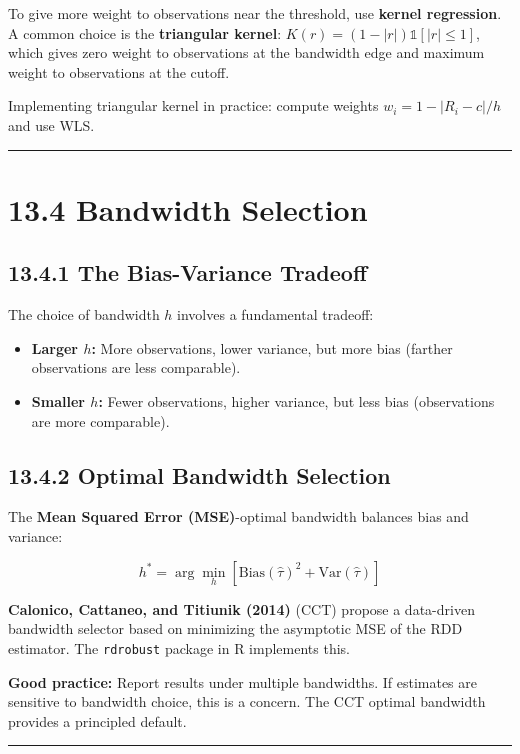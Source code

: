 To give more weight to observations near the threshold, use \textbf{kernel regression}. A common choice is the \textbf{triangular kernel}: $K(r) = (1 - |r|)\mathbb{1}[|r| \leq 1]$, which gives zero weight to observations at the bandwidth edge and maximum weight to observations at the cutoff.

Implementing triangular kernel in practice: compute weights $w_i = 1 - |R_i - c|/h$ and use WLS.

\medskip\hrule\medskip

\section{13.4 Bandwidth Selection}

\subsection{13.4.1 The Bias-Variance Tradeoff}

The choice of bandwidth $h$ involves a fundamental tradeoff:

\begin{itemize}
\item \textbf{Larger $h$:} More observations, lower variance, but more bias (farther observations are less comparable).
\item \textbf{Smaller $h$:} Fewer observations, higher variance, but less bias (observations are more comparable).
\end{itemize}

\subsection{13.4.2 Optimal Bandwidth Selection}

The \textbf{Mean Squared Error (MSE)}-optimal bandwidth balances bias and variance:

\[
h^* = \arg\min_h \left[\text{Bias}(\hat{\tau})^2 + \text{Var}(\hat{\tau})\right]
\]

\textbf{Calonico, Cattaneo, and Titiunik (2014)} (CCT) propose a data-driven bandwidth selector based on minimizing the asymptotic MSE of the RDD estimator. The \texttt{rdrobust} package in R implements this.

\textbf{Good practice:} Report results under multiple bandwidths. If estimates are sensitive to bandwidth choice, this is a concern. The CCT optimal bandwidth provides a principled default.

\medskip\hrule\medskip

